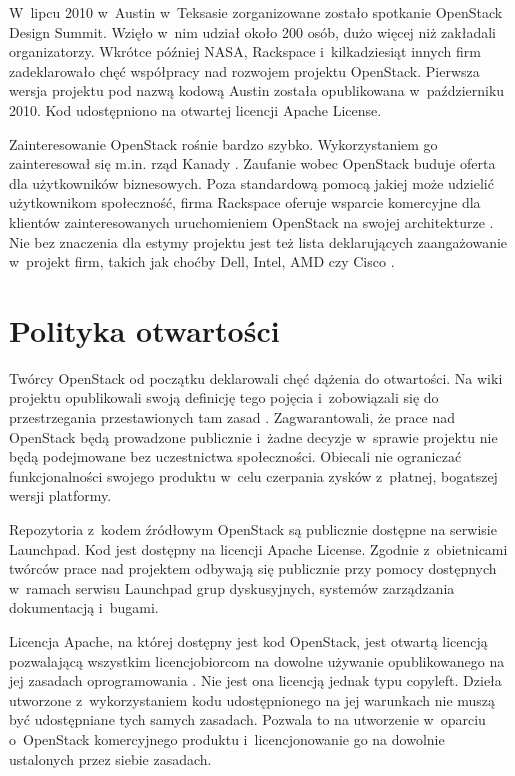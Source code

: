 	W~lipcu 2010 w~Austin w~Teksasie zorganizowane zostało spotkanie OpenStack
	Design Summit. Wzięło w~nim udział około 200 osób, dużo więcej niż
	zakładali organizatorzy. Wkrótce później NASA, Rackspace i~kilkadziesiąt
	innych firm zadeklarowało chęć współpracy nad rozwojem projektu OpenStack.
	Pierwsza wersja projektu pod nazwą kodową Austin została opublikowana
	w~październiku 2010. Kod udostępniono na otwartej licencji Apache License.

	Zainteresowanie OpenStack rośnie bardzo szybko. Wykorzystaniem go
	zainteresował się m.in. rząd Kanady \cite{computerworld_bort}. Zaufanie
	wobec OpenStack buduje oferta dla użytkowników biznesowych. Poza
	standardową pomocą jakiej może udzielić użytkownikom społeczność, firma
	Rackspace oferuje wsparcie komercyjne dla klientów zainteresowanych
	uruchomieniem OpenStack na swojej architekturze
	\cite{openstack_goes_commercial}. Nie bez znaczenia dla estymy projektu jest
	też lista deklarujących zaangażowanie w~projekt firm, takich jak choćby
	Dell, Intel, AMD czy Cisco \cite{openstack}.

	\section{Polityka otwartości}

	Twórcy OpenStack od początku deklarowali chęć dążenia do otwartości. Na wiki
	projektu opublikowali swoją definicję tego pojęcia i~zobowiązali się do
	przestrzegania przestawionych tam zasad \cite{openness}. Zagwarantowali, że
	prace nad OpenStack będą prowadzone publicznie i~żadne decyzje w~sprawie
	projektu nie będą podejmowane bez uczestnictwa społeczności. Obiecali
	nie ograniczać funkcjonalności swojego produktu w~celu czerpania zysków
	z~płatnej, bogatszej wersji platformy.

	Repozytoria z~kodem źródłowym OpenStack są publicznie dostępne na serwisie
	Launchpad. Kod jest dostępny na licencji Apache License. Zgodnie
	z~obietnicami twórców prace nad projektem odbywają się publicznie przy
	pomocy dostępnych w~ramach serwisu Launchpad grup dyskusyjnych, systemów
	zarządzania dokumentacją i~bugami.

	Licencja Apache, na której dostępny jest kod OpenStack, jest otwartą
	licencją pozwalającą wszystkim licencjobiorcom na dowolne używanie
	opublikowanego na jej zasadach oprogramowania \cite{apache_license_faq}. Nie
	jest ona licencją jednak typu copyleft. Dzieła utworzone z~wykorzystaniem
	kodu udostępnionego na jej warunkach nie muszą być udostępniane tych samych
	zasadach. Pozwala to na utworzenie w~oparciu o~OpenStack komercyjnego
	produktu i~licencjonowanie go na dowolnie ustalonych przez siebie zasadach.


